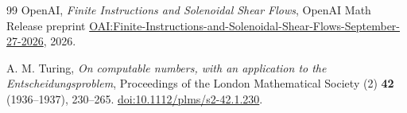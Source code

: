 \begin{thebibliography}{99}
OpenAI, \emph{Finite Instructions and Solenoidal Shear Flows},
OpenAI Math Release preprint
\href{https://github.com/openai/math/blob/main/preprints/Finite-Instructions-and-Solenoidal-Shear-Flows-September-27-2026/manuscript.pdf}{OAI:Finite-Instructions-and-Solenoidal-Shear-Flows-September-27-2026},
2026.

A. M. Turing, \emph{On computable numbers, with an application to the
Entscheidungsproblem}, Proceedings of the London Mathematical Society (2)
\textbf{42} (1936--1937), 230--265.
\href{https://doi.org/10.1112/plms/s2-42.1.230}{doi:10.1112/plms/s2-42.1.230}.
\end{thebibliography}
